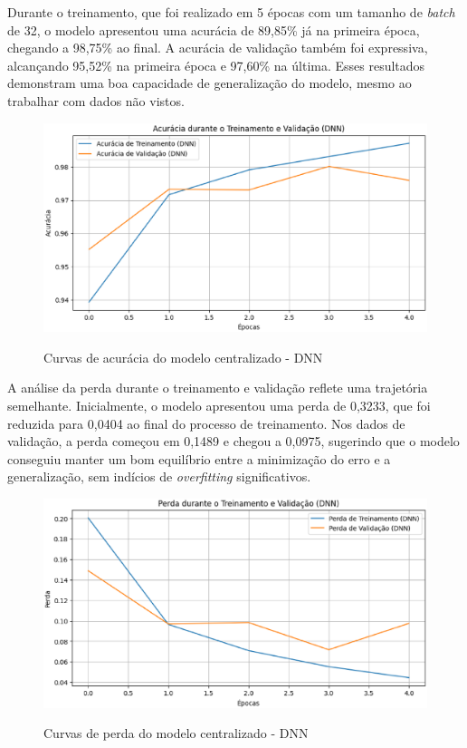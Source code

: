 Durante o treinamento, que foi realizado em 5 épocas com um tamanho de \textit{batch} de 32, o modelo apresentou uma acurácia de 89,85\% já na primeira época, chegando a 98,75\% ao final. A acurácia de validação também foi expressiva, alcançando 95,52\% na primeira época e 97,60\% na última. Esses resultados demonstram uma boa capacidade de generalização do modelo, mesmo ao trabalhar com dados não vistos.

\begin{figure}[ht]
    \centering
    \caption{Curvas de acurácia do modelo centralizado - DNN}
    \includegraphics[scale=0.4]{figuras/analiseResultados/acuracyDNN.eps}
    \label{fig:acuracyDNN}
\end{figure}

A análise da perda durante o treinamento e validação reflete uma trajetória semelhante. Inicialmente, o modelo apresentou uma perda de 0,3233, que foi reduzida para 0,0404 ao final do processo de treinamento. Nos dados de validação, a perda começou em 0,1489 e chegou a 0,0975, sugerindo que o modelo conseguiu manter um bom equilíbrio entre a minimização do erro e a generalização, sem indícios de \textit{overfitting} significativos.

\begin{figure}[ht]
    \centering
    \caption{Curvas de perda do modelo centralizado - DNN}
    \includegraphics[scale=0.4]{figuras/analiseResultados/lossDNN.eps}
    \label{fig:lossDNN}
\end{figure}


